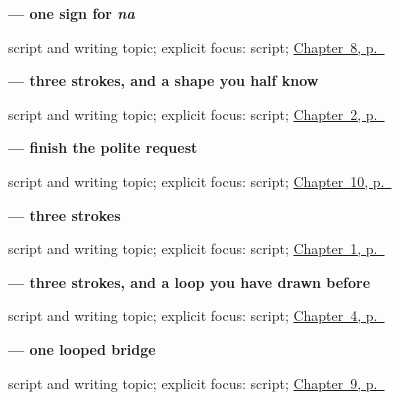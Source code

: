 \noindent\begin{minipage}[t]{\linewidth}
\raggedright
\textbf{ — one sign for \emph{na}}\par
\footnotesize script and writing topic; explicit focus: script; \hyperref[ch:ja-sayounara]{Chapter~8, p.~\pageref*{ch:ja-sayounara}}
\end{minipage}\par\smallskip

\noindent\begin{minipage}[t]{\linewidth}
\raggedright
\textbf{ — three strokes, and a shape you half know}\par
\footnotesize script and writing topic; explicit focus: script; \hyperref[ch:ja-daytime-greeting]{Chapter~2, p.~\pageref*{ch:ja-daytime-greeting}}
\end{minipage}\par\smallskip

\noindent\begin{minipage}[t]{\linewidth}
\raggedright
\textbf{ — finish the polite request}\par
\footnotesize script and writing topic; explicit focus: script; \hyperref[ch:ja-slower-please]{Chapter~10, p.~\pageref*{ch:ja-slower-please}}
\end{minipage}\par\smallskip

\noindent\begin{minipage}[t]{\linewidth}
\raggedright
\textbf{ — three strokes}\par
\footnotesize script and writing topic; explicit focus: script; \hyperref[ch:ja-two-answers]{Chapter~1, p.~\pageref*{ch:ja-two-answers}}
\end{minipage}\par\smallskip

\noindent\begin{minipage}[t]{\linewidth}
\raggedright
\textbf{ — three strokes, and a loop you have drawn before}\par
\footnotesize script and writing topic; explicit focus: script; \hyperref[ch:ja-polite-thanks]{Chapter~4, p.~\pageref*{ch:ja-polite-thanks}}
\end{minipage}\par\smallskip

\noindent\begin{minipage}[t]{\linewidth}
\raggedright
\textbf{ — one looped bridge}\par
\footnotesize script and writing topic; explicit focus: script; \hyperref[ch:ja-repeat-please]{Chapter~9, p.~\pageref*{ch:ja-repeat-please}}
\end{minipage}\par\smallskip

